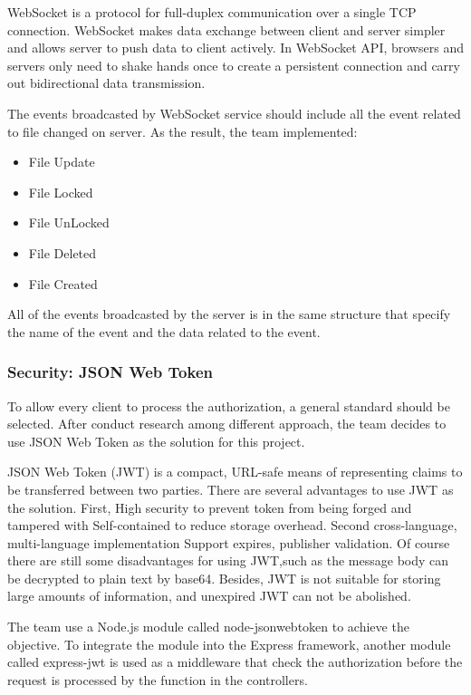 \documentclass{article}
\begin{document}
WebSocket is a protocol for full-duplex communication over a single TCP connection. WebSocket makes data exchange between client and server simpler and allows server to push data to client actively. \cite{c7}In WebSocket API, browsers and servers only need to shake hands once to create a persistent connection and carry out bidirectional data transmission.

The events broadcasted by WebSocket service should include all the event related to file changed on server. As the result, the team implemented:
\begin{itemize}
  \item File Update
  \item File Locked
  \item File UnLocked
  \item File Deleted
  \item File Created
\end{itemize}
All of the events broadcasted by the server is in the same structure that specify the name of the event and the data related to the event.

\subsubsection{Security: JSON Web Token}

To allow every client to process the authorization, a general standard should be selected. After conduct research among different approach, the team decides to use JSON Web Token as the solution for this project.

JSON Web Token (JWT) is a compact, URL-safe means of representing claims to be transferred between two parties. There are several advantages to use JWT as the solution.\cite{c8} First, High security to prevent token from being forged and tampered with Self-contained to reduce storage overhead. Second cross-language, multi-language implementation Support expires, publisher validation.
Of course there are still some disadvantages for using JWT,such as the message body can be decrypted to plain text by base64. Besides, JWT is not suitable for storing large amounts of information, and unexpired JWT can not be abolished.

The team use a Node.js module called node-jsonwebtoken to achieve the objective. To integrate the module into the Express framework, another module called express-jwt is used as a middleware that check the authorization before the request is processed by the function in the controllers. 
\end{document}
